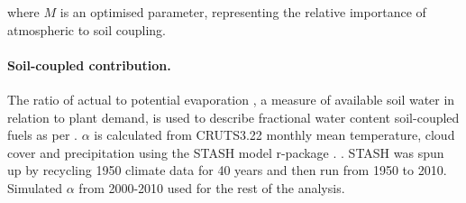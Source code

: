 where $M$ is an optimised parameter, representing the relative importance of atmospheric to soil coupling.

\paragraph{Soil-coupled contribution.}
The ratio of actual to potential evaporation \citep[$\alpha$][]{prentice1993simulation}, a measure of available soil water in relation to plant demand, is used to describe fractional water content soil-coupled fuels as per \citet{harrison2010fire, bistinas2014causal}.
$\alpha$ is calculated from CRUTS3.22 monthly mean temperature, cloud cover and precipitation using the STASH model \citep{sykes1996bioclimatic} r-package \citep{rstash}. . STASH was spun up by recycling 1950 climate data for 40 years and then run from 1950 to 2010. Simulated $\alpha$ from 2000-2010 used for the rest of the analysis.

